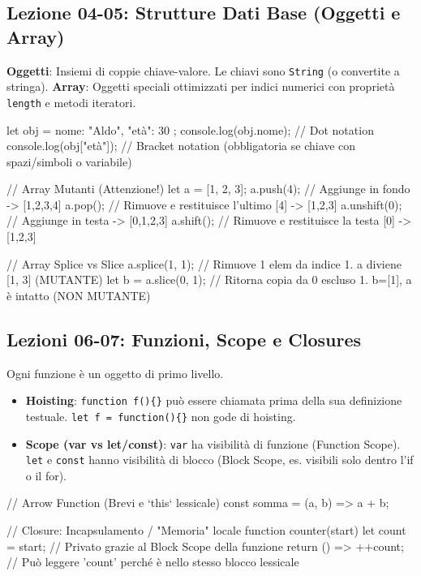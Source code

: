 \documentclass[a4paper,10pt]{article}
\begin{document}
\subsection{Lezione 04-05: Strutture Dati Base (Oggetti e Array)}
\textbf{Oggetti}: Insiemi di coppie chiave-valore. Le chiavi sono \texttt{String} (o convertite a stringa).
\textbf{Array}: Oggetti speciali ottimizzati per indici numerici con proprietà \texttt{length} e metodi iteratori.

\begin{jsbox}[title={Snippet: Interazione con Array e Oggetti}]
let obj = { nome: "Aldo", "età": 30 };
console.log(obj.nome); // Dot notation
console.log(obj["età"]); // Bracket notation (obbligatoria se chiave con spazi/simboli o variabile)

// Array Mutanti (Attenzione!)
let a = [1, 2, 3];
a.push(4);    // Aggiunge in fondo -> [1,2,3,4]
a.pop();      // Rimuove e restituisce l'ultimo [4] -> [1,2,3]
a.unshift(0); // Aggiunge in testa -> [0,1,2,3]
a.shift();    // Rimuove e restituisce la testa [0] -> [1,2,3]

// Array Splice vs Slice
a.splice(1, 1); // Rimuove 1 elem da indice 1. a diviene [1, 3] (MUTANTE)
let b = a.slice(0, 1); // Ritorna copia da 0 escluso 1. b=[1], a è intatto (NON MUTANTE)
\end{jsbox}

\subsection{Lezioni 06-07: Funzioni, Scope e Closures}
Ogni funzione è un oggetto di primo livello.
\begin{itemize}
    \item \textbf{Hoisting}: \texttt{function f()\{\}} può essere chiamata prima della sua definizione testuale. \texttt{let f = function()\{\}} non gode di hoisting.
    \item \textbf{Scope (var vs let/const)}: \texttt{var} ha visibilità di funzione (Function Scope). \texttt{let} e \texttt{const} hanno visibilità di blocco (Block Scope, es. visibili solo dentro l'if o il for).
\end{itemize}

\begin{jsbox}[title={Snippet: Dichiarazioni e Closures}]
// Arrow Function (Brevi e `this` lessicale)
const somma = (a, b) => a + b; 

// Closure: Incapsulamento / "Memoria" locale
function counter(start) {
    let count = start; // Privato grazie al Block Scope della funzione
    return () => ++count; // Può leggere 'count' perché è nello stesso blocco lessicale
}
\end{jsbox}
\end{document}
